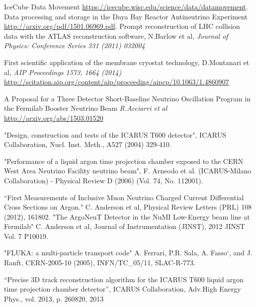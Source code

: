\begin{thebibliography}{99}
 IceCube Data Movement \url{https://icecube.wisc.edu/science/data/datamovement}.
Data processing and storage in the Daya Bay Reactor Antineutrino Experiment \url{http://arxiv.org/pdf/1501.06969.pdf}.
 Prompt reconstruction of LHC collision data with the ATLAS reconstruction software, N.Barlow et al, \textit{Journal of Physics: Conference Series 331 (2011) 032004}

 First scientific application of the membrane cryostat technology, D.Montanari et al, \textit{AIP Proceedings 1573, 1664 (2014)} \url{http://scitation.aip.org/content/aip/proceeding/aipcp/10.1063/1.4860907}

  A Proposal for a Three Detector Short-Baseline Neutrino Oscillation Program in the Fermilab Booster Neutrino Beam \textit{R.Acciarri et al} \url{http://arxiv.org/abs/1503.01520}
 

 "Design, construction and tests of the ICARUS T600 detector", ICARUS Collaboration, Nucl. Inst. Meth., A527 (2004) 329-410. 

 "Performance of a liquid argon time projection chamber exposed to the CERN West Area Neutrino Facility neutrino beam", F. Arneodo et al. (ICARUS-Milano Collaboration) - Physical Review D (2006) (Vol. 74, No. 112001). 

 ``First Measurements of Inclusive Muon Neutrino Charged Current Differential Cross Sections on Argon." C. Anderson et al, Physical Review Letters (PRL) 108 (2012), 161802. 
 "The ArgoNeuT Detector in the NuMI Low-Energy beam line at Fermilab" C. Anderson et al, Journal of Instrumentation (JINST), 2012 JINST Vol. 7 P10019. 

 "FLUKA: a multi-particle transport code" A. Ferrari, P.R. Sala, A. Fasso`, and J. Ranft, CERN-2005-10 (2005), INFN/TC\_05/11, SLAC-R-773.

``Precise 3D track reconstruction algorithm for the ICARUS T600 liquid argon time projection chamber detector'', ICARUS Collaboration, 
Adv.High Energy Phys., vol. 2013, p. 260820, 2013


\end{thebibliography}
